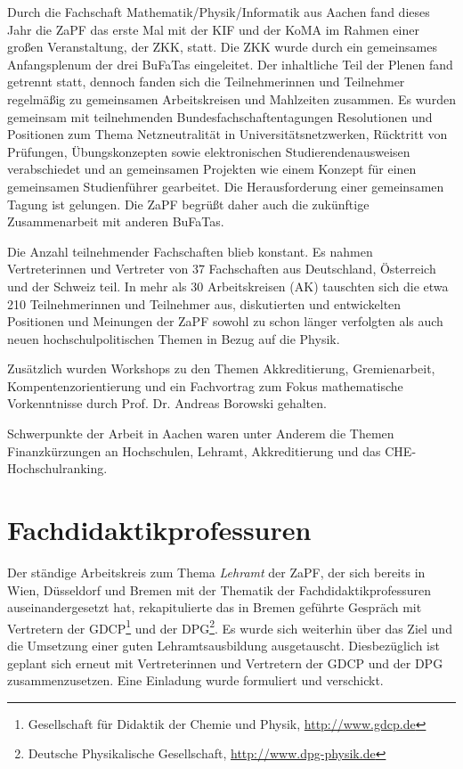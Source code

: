 \documentclass{scrartcl}
\renewcommand{\headrulewidth}{0pt}
\begin{document}
Durch die Fachschaft Mathematik/Physik/Informatik aus Aachen fand dieses Jahr
die ZaPF das erste Mal mit der KIF und der KoMA im Rahmen einer großen
Veranstaltung, der ZKK, statt. Die ZKK wurde durch ein gemeinsames
Anfangsplenum der drei BuFaTas eingeleitet. Der inhaltliche Teil der Plenen
fand getrennt statt, dennoch fanden sich die Teilnehmerinnen und Teilnehmer
regelmäßig zu gemeinsamen Arbeitskreisen und Mahlzeiten
zusammen. 
Es wurden gemeinsam mit teilnehmenden Bundesfachschaftentagungen Resolutionen und Positionen zum Thema Netzneutralität in Universitätsnetzwerken, Rücktritt von Prüfungen, Übungskonzepten sowie elektronischen Studierendenausweisen verabschiedet und an gemeinsamen Projekten wie einem Konzept für einen gemeinsamen Studienführer gearbeitet. Die Herausforderung einer  gemeinsamen Tagung ist gelungen. 
Die ZaPF begrüßt daher auch die zukünftige Zusammenarbeit mit anderen BuFaTas.

Die Anzahl teilnehmender Fachschaften blieb konstant. Es nahmen
Vertreterinnen und Vertreter von 37 Fachschaften aus Deutschland, Österreich
und der Schweiz teil. In mehr als 30 Arbeitskreisen (AK) tauschten sich die
etwa 210 Teilnehmerinnen und Teilnehmer aus, diskutierten und entwickelten
Positionen und Meinungen der ZaPF sowohl zu schon länger verfolgten  als auch
neuen hochschulpolitischen Themen in Bezug auf die Physik. 
\newpage

Zusätzlich wurden
Workshops zu den Themen Akkreditierung, Gremienarbeit, Kompentenzorientierung
und ein Fachvortrag zum Fokus mathematische Vorkenntnisse durch Prof. Dr.
Andreas Borowski gehalten.

Schwerpunkte der Arbeit in Aachen waren unter Anderem die Themen Finanzkürzungen
an Hochschulen, Lehramt, Akkreditierung und das CHE-Hochschulranking.


\renewcommand{\headrulewidth}{0.1pt}
\rhead{\thepage}


\section*{Fachdidaktikprofessuren}

Der  ständige  Arbeitskreis zum Thema \emph{Lehramt} der ZaPF, der sich bereits 
in Wien, Düsseldorf und Bremen mit  der Thematik der Fachdidaktikprofessuren
auseinandergesetzt hat, rekapitulierte das in Bremen geführte Gespräch mit
Vertretern der GDCP\footnote{Gesellschaft für Didaktik der Chemie und Physik,
\href{http://www.gdcp.de}{\url{http://www.gdcp.de}}} und der DPG\footnote{Deutsche Physikalische Gesellschaft, \href{http://www.dpg-physik.de}{\url{http://www.dpg-physik.de}}}.
Es wurde sich weiterhin über  das Ziel und die Umsetzung einer guten
Lehramtsausbildung ausgetauscht.  Diesbezüglich ist geplant sich erneut mit
Vertreterinnen und Vertretern der GDCP und der DPG zusammenzusetzen.
Eine Einladung wurde formuliert und verschickt.
\end{document}
